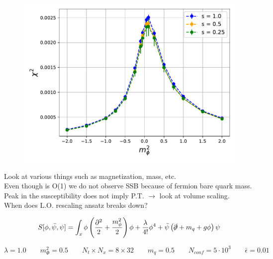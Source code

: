 \begin{figure}
    \centering
    \includegraphics[scale=0.7]{figures/phase_trans/chi2.pdf}
    \caption{}
    \label{fig:chi_volume_scaling}
\end{figure}


Look at various things such as magnetization, mass, etc. \\
Even though is O(1) we do not observe SSB because of fermion bare quark mass. \\
Peak in the susceptibility does not imply P.T. $\rightarrow$ look at volume scaling. \\
When does L.O. rescaling ansatz breaks down?


\newpage

\begin{equation*}
    S[\phi, \bar\psi, \psi] = \int_x \phi \left(\frac{\partial^2}{2} + \frac{m_\phi^2}{2}\right) \phi + \frac{\lambda}{4!} \phi^4 + \bar \psi \left(\slashed{\partial} + m_q + g\phi\right) \psi
\end{equation*}

\begin{equation*} 
    \lambda = 1.0 \qquad m_\Phi^2 = 0.5 \qquad N_t \times N_x = 8 \times 32 \qquad m_q = 0.5 \qquad N_{conf} = 5 \cdot 10^3 \qquad \bar\epsilon = 0.01
\end{equation*}

